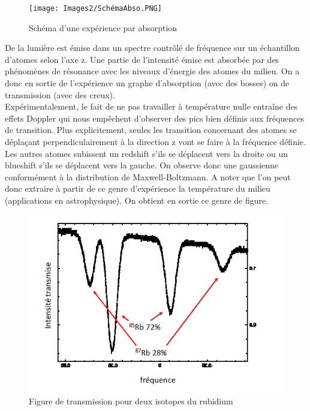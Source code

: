 \begin{figure}[tph]
    \centering
    \texttt{[image: Images2/SchémaAbso.PNG]}
    \caption{Schéma d'une expérience par absorption}
    \label{fig:SchémaAbso}
\end{figure}

De la lumière est émise dans un spectre contrôlé de fréquence sur un échantillon d'atomes selon l'axe z. Une partie de l'intensité émise est absorbée par des phénomènes de résonance avec les niveaux d'énergie des atomes du milieu. On a donc en sortie de l'expérience un graphe d'absorption (avec des bosses) on de transmission (avec des creux).\\

Expérimentalement, le fait de ne pas travailler à température nulle entraîne des effets Doppler qui nous empêchent d'observer des pics bien définis aux fréquences de transition. Plus explicitement, seules les transition concernant des atomes se déplaçant perpendiculairement à la direction z vont se faire à la fréquence définie. Les autres atomes subissent un redshift s'ils se déplacent vers la droite ou un blueshift s'ils se déplacent vers la gauche. On observe donc une gaussienne conformément à la distribution de Maxwell-Boltzmann. A noter que l'on peut donc extraire à partir de ce genre d'expérience la température du milieu (applications en astrophysique). On obtient en sortie ce genre de figure.\\

\begin{figure}[tph]
    \centering
    \includegraphics[scale=1.0]{Images2/Absorption.PNG}
    \caption{Figure de transmission pour deux isotopes du rubidium}
\label{eq:abso}
\end{figure}

